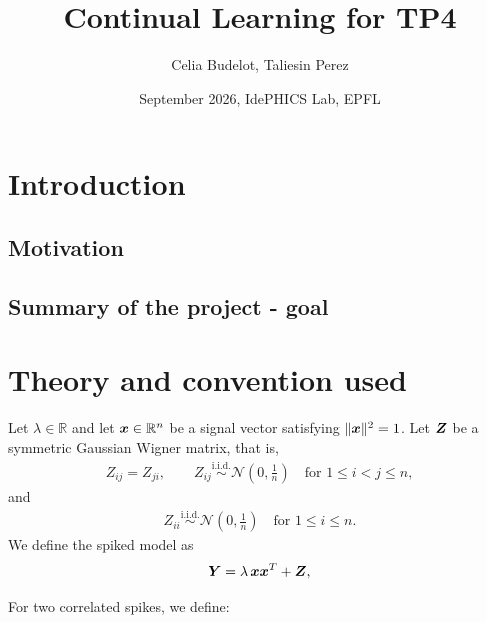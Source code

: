 \documentclass[11pt]{article}
\title{\bf Continual Learning for TP4}
\author{Celia Budelot, Taliesin Perez}
\date{September 2026, IdePHICS Lab, EPFL}
\begin{document}
\maketitle
\tableofcontents
\newpage

\section{Introduction}
\subsection{Motivation}
\subsection{Summary of the project - goal}

\section{Theory and convention used}
\begin{defn} \label{def:spiked-wigner}
Let $\lambda \in \mathbb{R}$ and let $\bm{x} \in \mathbb{R}^n$ be a signal vector satisfying \( \|\bm{x}\|^2 = 1\). Let $\bm{Z}$ be a symmetric Gaussian Wigner matrix, that is,
\begin{align}
Z_{ij} = Z_{ji}, \qquad Z_{ij} \overset{\mathrm{i.i.d.}}{\sim} \mathcal N(0,\frac{1}{n})    \quad \text{for } 1\le i<j\le n,
\end{align}
and
\begin{align}
Z_{ii} \overset{\mathrm{i.i.d.}}{\sim} \mathcal N(0,\frac{1}{n}) \quad \text{for } 1\le i\le n.
\end{align}
\noindent
We define the spiked model as
\begin{equation}
    \bm{Y} = \lambda \,\bm{x} \bm{x}^T + \bm{Z},
    \label{norm2}
\end{equation}
\end{defn}
For two correlated spikes, we define:
\end{document}
